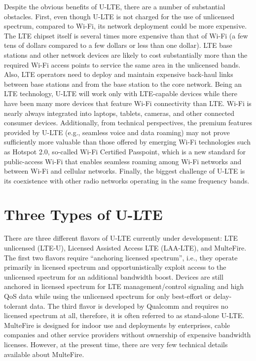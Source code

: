 Despite the obvious benefits of \mbox{U-LTE}, there are a number of substantial obstacles. First, even though \mbox{U-LTE} is not charged for the use of unlicensed spectrum, compared to \mbox{Wi-Fi}, its network deployment could be more expensive. The LTE chipset itself is several times more expensive than that of \mbox{Wi-Fi} (a few tens of dollars compared to a few dollars or less than one dollar). LTE base stations and other network devices are likely to cost substantially more than the required \mbox{Wi-Fi} access points to service the same area in the unlicensed bands.  Also, LTE operators need to deploy and maintain expensive back-haul links between base stations and from the base station to the core network. Being an LTE technology, \mbox{U-LTE} will work only with LTE-capable devices while there have been many more devices that feature \mbox{Wi-Fi} connectivity than LTE. \mbox{Wi-Fi} is nearly always integrated into laptops, tablets, cameras, and other connected consumer devices. Additionally, from technical perspectives, the premium features provided by \mbox{U-LTE} (e.g., seamless voice and data roaming) may not prove sufficiently more valuable than those offered by emerging \mbox{Wi-Fi} technologies such as Hotspot 2.0, so-called \mbox{Wi-Fi} Certified Passpoint, which is a new standard for public-access \mbox{Wi-Fi} that enables seamless roaming among \mbox{Wi-Fi} networks and between \mbox{Wi-Fi} and cellular networks. Finally, the biggest challenge of \mbox{U-LTE} is its coexistence with other radio networks operating in the same frequency bands. 

\section{Three Types of U-LTE}
\label{lte-types}
There are three different flavors of \mbox{U-LTE} currently under development: LTE unlicensed (\mbox{LTE-U}), Licensed Assisted Access LTE (\mbox{LAA-LTE}), and MulteFire. The first two flavors require ``anchoring licensed spectrum'', i.e., they operate primarily in licensed spectrum and opportunistically exploit access to the unlicensed spectrum for an additional bandwidth boost. Devices are still anchored in licensed spectrum for LTE management/control signaling and high QoS data while using the unlicensed spectrum for only best-effort or delay-tolerant data. The third flavor is developed by Qualcomm and requires no licensed spectrum at all, therefore, it is often referred to as stand-alone \mbox{U-LTE}. MulteFire is designed for indoor use and deployments by enterprises, cable companies and other service providers without ownership of expensive bandwidth licenses. However, at the present time, there are very few technical details available about MulteFire.


